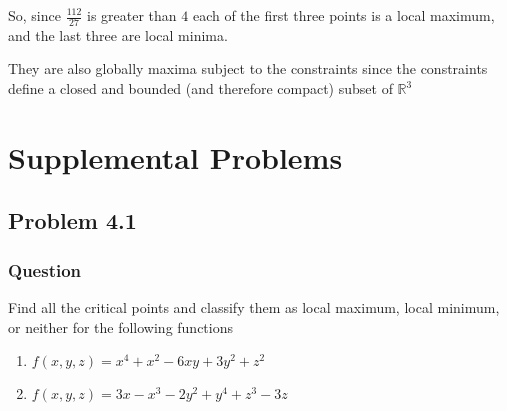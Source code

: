 \documentclass[12pt]{article}
\begin{document}
So, since $\frac{112}{27}$ is greater than $4$ each of the first three points is a local maximum, and the last three are local minima.

They are also globally maxima subject to the constraints since the constraints define a closed and bounded (and therefore compact) subset of $\mathbb{R}^3$

\section{Supplemental Problems} 

\subsection{Problem 4.1}
\subsubsection{Question}
Find all the critical points and classify them as local maximum, local minimum, or neither for the following functions
\begin{enumerate}
\item $f(x,y,z)=x^4+x^2-6xy+3y^2+z^2$
\item $f(x,y,z)=3x-x^3-2y^2+y^4+z^3-3z$
\end{enumerate}
\end{document}
